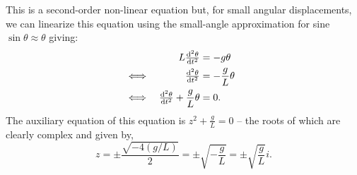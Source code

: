 \documentclass[../MathsNotesBase.tex]{subfiles}
\begin{document}
{\begin{exe}
{				This is a second-order non-linear equation but, for small angular displacements, we can linearize this equation using the small-angle approximation for sine ${ \sin\theta \approx \theta }$ giving:
				\begin{align*}
					&&  L \od[2]{\theta}{t} &= - g \theta \\
					&\iff & \od[2]{\theta}{t} &= - \frac{g}{L} \theta &\sidecomment{} \\
					&\iff & \od[2]{\theta}{t} + \frac{g}{L} \theta &= 0.
				\end{align*}
				The auxiliary equation of this equation is ${ z^2 + \frac{g}{L} = 0 }$ -- the roots of which are clearly complex and given by,
				\[ z = \pm \frac{\sqrt{-4(g/L)}}{2} = \pm \sqrt{-\frac{g}{L}} = \pm \sqrt{\frac{g}{L}} i. \]
				
				
			}\label{ex:pendulum-second-order-linear}
		\end{exe}
	}


	\pagebreak
\end{document}
